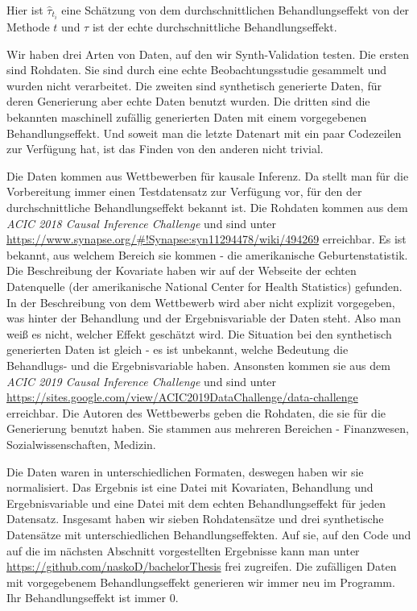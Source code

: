 \documentclass[12pt,a4paper,twoside]{scrartcl}
\numberwithin{equation}{section}
\begin{document}
\noindent
Hier ist $\hat{\tau}_{t_i}$ eine Schätzung von dem durchschnittlichen Behandlungseffekt von der Methode $t$ und $\tau$ ist der echte durchschnittliche Behandlungseffekt.\par

\noindent
Wir haben drei Arten von Daten, auf den wir Synth-Validation testen. Die ersten sind Rohdaten. Sie sind durch eine echte Beobachtungsstudie gesammelt und wurden nicht verarbeitet. Die zweiten sind synthetisch generierte Daten, für deren Generierung aber echte Daten benutzt wurden. Die dritten sind die bekannten maschinell zufällig generierten Daten mit einem vorgegebenen Behandlungseffekt. Und soweit man die letzte Datenart mit ein paar Codezeilen zur Verfügung hat, ist das Finden von den anderen nicht trivial.\par 

\noindent
Die Daten kommen aus Wettbewerben für kausale Inferenz. Da stellt man für die Vorbereitung immer einen Testdatensatz zur Verfügung vor, für den der durchschnittliche Behandlungseffekt bekannt ist. Die Rohdaten kommen aus dem \emph{ACIC 2018 Causal Inference Challenge} und sind unter \url{https://www.synapse.org/#!Synapse:syn11294478/wiki/494269} erreichbar. Es ist bekannt, aus welchem Bereich sie kommen - die amerikanische Geburtenstatistik. Die Beschreibung der Kovariate haben wir auf der Webseite der echten Datenquelle (der amerikanische National Center for Health Statistics) gefunden. In der Beschreibung von dem Wettbewerb wird aber nicht explizit vorgegeben, was hinter der Behandlung und der Ergebnisvariable der Daten steht. Also man weiß es nicht, welcher Effekt geschätzt wird. Die Situation bei den synthetisch generierten Daten ist gleich - es ist unbekannt, welche Bedeutung die Behandlugs- und die Ergebnisvariable haben. Ansonsten kommen sie aus dem \emph{ACIC 2019 Causal Inference Challenge} und sind unter \url{https://sites.google.com/view/ACIC2019DataChallenge/data-challenge} erreichbar. Die Autoren des Wettbewerbs geben die Rohdaten, die sie für die Generierung benutzt haben. Sie stammen aus mehreren Bereichen - Finanzwesen, Sozialwissenschaften, Medizin.\par   

\noindent
Die Daten waren in unterschiedlichen Formaten, deswegen haben wir sie normalisiert. Das Ergebnis ist eine Datei mit Kovariaten, Behandlung und Ergebnisvariable und eine Datei mit dem echten Behandlungseffekt für jeden Datensatz. Insgesamt haben wir sieben Rohdatensätze und drei synthetische Datensätze mit unterschiedlichen Behandlungseffekten. Auf sie, auf den Code und auf die im nächsten Abschnitt vorgestellten Ergebnisse kann man unter \url{https://github.com/naskoD/bachelorThesis} frei zugreifen. Die zufälligen Daten mit vorgegebenem  Behandlungseffekt generieren wir immer neu im Programm. Ihr Behandlungseffekt ist immer 0.\par
\end{document}

